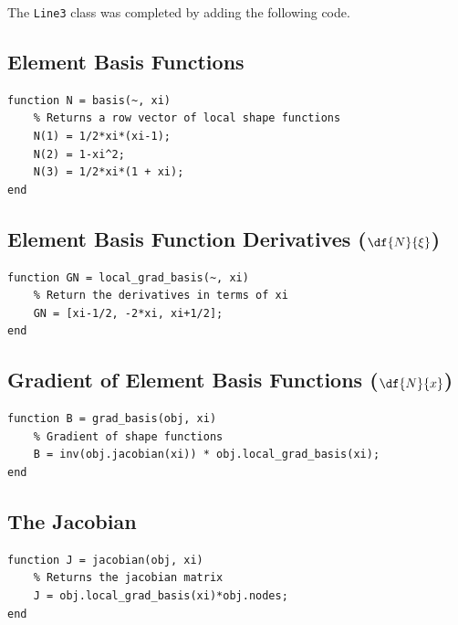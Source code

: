 The \texttt{Line3} class was completed by adding the following code.

\subsection{Element Basis Functions}
\begin{lstlisting}
function N = basis(~, xi)
	% Returns a row vector of local shape functions
	N(1) = 1/2*xi*(xi-1);
	N(2) = 1-xi^2;
	N(3) = 1/2*xi*(1 + xi);
end
\end{lstlisting}

\subsection{Element Basis Function Derivatives ($\df{N}{\xi}$)}
\begin{lstlisting}
function GN = local_grad_basis(~, xi)
	% Return the derivatives in terms of xi
	GN = [xi-1/2, -2*xi, xi+1/2];
end
\end{lstlisting}

\subsection{Gradient of Element Basis Functions ($\df{N}{x}$)}
\begin{lstlisting}
function B = grad_basis(obj, xi) 
	% Gradient of shape functions
	B = inv(obj.jacobian(xi)) * obj.local_grad_basis(xi);
end
\end{lstlisting}

\subsection{The Jacobian}
\begin{lstlisting}
function J = jacobian(obj, xi)
	% Returns the jacobian matrix
	J = obj.local_grad_basis(xi)*obj.nodes;                 
end
\end{lstlisting}

